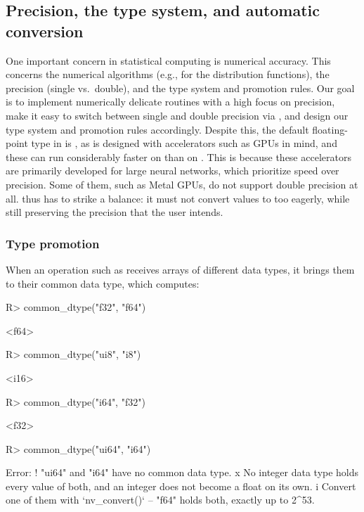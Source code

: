 \documentclass[article,shortnames]{jss}
\renewenvironment{CodeChunk}{\par\addvspace{0.6\baselineskip}\noindent\begin{minipage}{\linewidth}}{\end{minipage}\par\vspace{0.6\baselineskip}}
\newcommand{\fitcode}{\fvset{fontsize=\small}}
\begin{document}
\subsection{Precision, the type system, and automatic conversion}\label{type-system}

One important concern in statistical computing is numerical accuracy.
This concerns the numerical algorithms (e.g., for the distribution functions), the precision (single vs.\ double), and the type system and promotion rules.
Our goal is to implement numerically delicate routines with a high focus on precision, make it easy to switch between single and double precision via , and design our type system and promotion rules accordingly.
Despite this, the default floating-point type in  is , as  is designed with accelerators such as GPUs in mind, and these can run considerably faster on  than on .
This is because these accelerators are primarily developed for large neural networks, which prioritize speed over precision.
Some of them, such as Metal GPUs, do not support double precision at all.
 thus has to strike a balance: it must not convert values to  too eagerly, while still preserving the precision that the user intends.

\subsubsection{Type promotion}\label{type-promotion}

When an operation such as  receives arrays of different data types, it brings them to their common data type, which  computes:

\begin{CodeChunk}
\fitcode
\begin{CodeInput}
R> common_dtype("f32", "f64")
\end{CodeInput}
\begin{CodeOutput}
<f64>
\end{CodeOutput}
\begin{CodeInput}
R> common_dtype("ui8", "i8")
\end{CodeInput}
\begin{CodeOutput}
<i16>
\end{CodeOutput}
\begin{CodeInput}
R> common_dtype("i64", "f32")
\end{CodeInput}
\begin{CodeOutput}
<f32>
\end{CodeOutput}
\begin{CodeInput}
R> common_dtype("ui64", "i64")
\end{CodeInput}
\begin{CodeOutput}
Error:
! "ui64" and "i64" have no common data type.
x No integer data type holds every value of both, and an integer does not
  become a float on its own.
i Convert one of them with `nv_convert()` -- "f64" holds both, exactly up to
  2^53.
\end{CodeOutput}
\end{CodeChunk}
\end{document}
